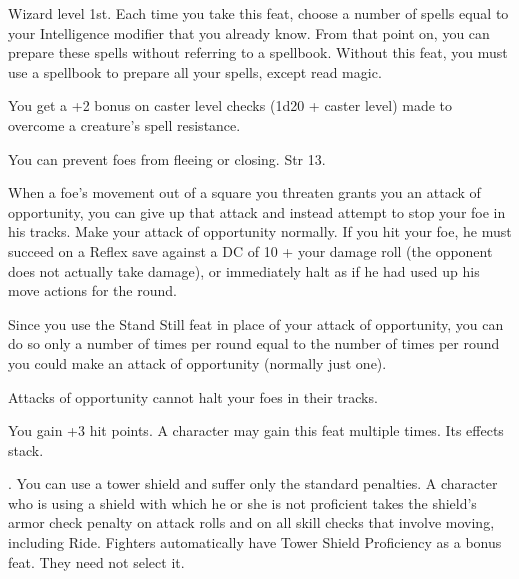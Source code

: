 {Wizard level 1st.}
{Each time you take this feat, choose a number of spells equal to your Intelligence modifier that you already know. From that point on, you can prepare these spells without referring to a spellbook.}
{Without this feat, you must use a spellbook to prepare all your spells, except read magic.}{}

{You get a +2 bonus on caster level checks (1d20 + caster level) made to overcome a creature's spell resistance.}

{You can prevent foes from fleeing or closing.}
{Str 13.}
{When a foe's movement out of a square you threaten grants you an attack of opportunity, you can give up that attack and instead attempt to stop your foe in his tracks. Make your attack of opportunity normally. If you hit your foe, he must succeed on a Reflex save against a DC of 10 + your damage roll (the opponent does not actually take damage), or immediately halt as if he had used up his move actions for the round.

Since you use the Stand Still feat in place of your attack of opportunity, you can do so only a number of times per round equal to the number of times per round you could make an attack of opportunity (normally just one).}
{Attacks of opportunity cannot halt your foes in their tracks.}{}

{}{}
{You gain +3 hit points.}{}
{A character may gain this feat multiple times. Its effects stack.}

{}
{.}
{You can use a tower shield and suffer only the standard penalties.}
{A character who is using a shield with which he or she is not proficient takes the shield's armor check penalty on attack rolls and on all skill checks that involve moving, including Ride.}
{Fighters automatically have Tower Shield Proficiency as a bonus feat. They need not select it.}

